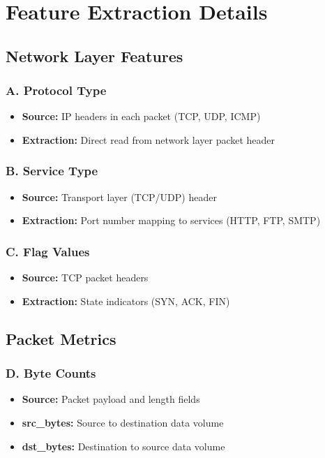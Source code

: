 \documentclass{article}
\begin{document}
\section{Feature Extraction Details}
\subsection{Network Layer Features}

\subsubsection{A. Protocol Type}
\begin{itemize}
    \item \textbf{Source:} IP headers in each packet (TCP, UDP, ICMP)
    \item \textbf{Extraction:} Direct read from network layer packet header
\end{itemize}

\subsubsection{B. Service Type}
\begin{itemize}
    \item \textbf{Source:} Transport layer (TCP/UDP) header
    \item \textbf{Extraction:} Port number mapping to services (HTTP, FTP, SMTP)
\end{itemize}

\subsubsection{C. Flag Values}
\begin{itemize}
    \item \textbf{Source:} TCP packet headers
    \item \textbf{Extraction:} State indicators (SYN, ACK, FIN)
\end{itemize}

\subsection{Packet Metrics}

\subsubsection{D. Byte Counts}
\begin{itemize}
    \item \textbf{Source:} Packet payload and length fields
    \item \textbf{src\_bytes:} Source to destination data volume
    \item \textbf{dst\_bytes:} Destination to source data volume
\end{itemize}
\end{document}
